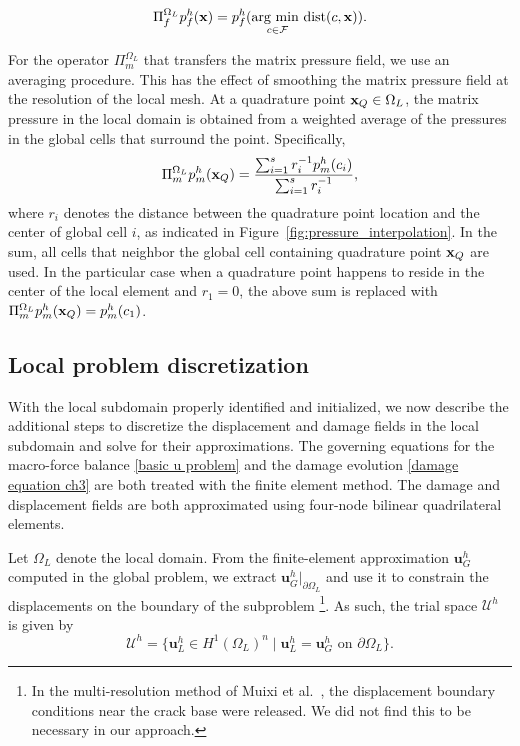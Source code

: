 \begin{equation}
    \Pi^{\Omega_L}_f p_f^h({\bf{x}}) = p_f^h(\underset{c \in \mathcal{F}}{\text{arg min }}\text{dist}(c,{\bf{x}} )).
\end{equation}

For the operator $\Pi^{\Omega_L}_m$ that transfers the matrix pressure field, we use an averaging procedure.  This has the effect of smoothing the matrix pressure field at the resolution of the local mesh.  At a quadrature point ${\bf{x}}_Q \in \Omega_L$, the matrix pressure in the local domain is obtained from a weighted average of the pressures in the global cells that surround the point.  Specifically, 
\begin{equation}
    \Pi^{\Omega_L}_m p_m^h({\bf{x}}_Q) = \dfrac{\sum_{i=1}^s r^{-1}_ip_m^h(c_i)}{\sum_{i=1}^s r^{-1}_i},
\end{equation}
where $r_i$ denotes the distance between the quadrature point location and the center of global cell $i$, as indicated in Figure~\ref{fig:pressure_interpolation}.  In the sum, all cells that neighbor the global cell containing quadrature point ${\bf{x}}_Q$ are used.  In the particular case when a quadrature point happens to reside in the center of the local element and $r_1 = 0$, the above sum is replaced with   
$ \Pi^{\Omega_L}_mp_m^h({\bf{x}}_Q) = p^h_m (c_1)$.

\subsection{Local problem discretization}

With the local subdomain properly identified and initialized, we now describe the additional steps to discretize the displacement and damage fields in the local subdomain and solve for their approximations.
The governing equations for the macro-force balance \eqref{basic u problem} and the damage evolution \eqref{damage equation ch3} are both treated with the finite element method.  The damage and displacement fields are both approximated using four-node bilinear quadrilateral elements. 

Let $\Omega_L$ denote the local domain. From the finite-element approximation $\textbf{u}_G^h$ computed in the global problem, we extract $\textbf{u}^h_G|_{\partial\Omega_L}$ and use it to constrain the displacements on the boundary of the subproblem \footnote{In the multi-resolution method of Muixi et al.\ \cite{muixi2021combined},  the displacement boundary conditions near the crack base were released. We did not find this to be necessary in our approach.}.  As such, the trial space $\boldsymbol{\mathcal{U}}^h$ is given by
\begin{equation}\label{disp subspace}
    \boldsymbol{\mathcal{U}}^h = \{ \textbf{u}_L^h \in H^1(\Omega_L)^n \mid \textbf{u}_L^h = \textbf{u}^h_G \text{ on } \partial\Omega_L \}.
\end{equation}

